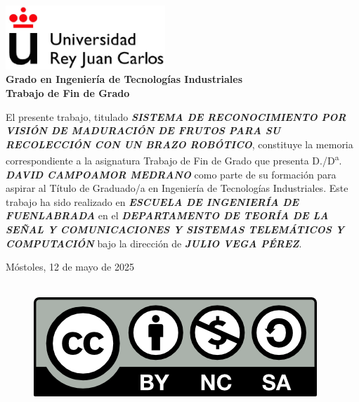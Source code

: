 

\thispagestyle{empty}
\begin{center}
    \includegraphics[width=0.45\textwidth]{figs/logo_urjc.jpg}\\[1cm]

    {\large{\textbf{Grado en Ingeniería de Tecnologías Industriales}}}\\[1cm]
    {\large{\textbf{Trabajo de Fin de Grado}}}\\[1cm]
\end{center}


El presente trabajo, titulado \textit{\textbf{SISTEMA DE RECONOCIMIENTO POR VISIÓN DE MADURACIÓN DE FRUTOS PARA SU RECOLECCIÓN CON UN BRAZO ROBÓTICO}}, constituye la memoria correspondiente a la asignatura Trabajo de Fin de Grado que presenta D./D\textsuperscript{a}. \textit{\textbf{DAVID CAMPOAMOR MEDRANO}} como parte de su formación para aspirar al Título de Graduado/a en Ingeniería de Tecnologías Industriales. Este trabajo ha sido realizado en \textit{\textbf{ESCUELA DE INGENIERÍA DE FUENLABRADA}} en el \textit{\textbf{DEPARTAMENTO DE TEORÍA DE LA SEÑAL Y COMUNICACIONES Y SISTEMAS TELEMÁTICOS Y COMPUTACIÓN}} bajo la dirección de \textit{\textbf{JULIO VEGA PÉREZ}}.\\[3cm]

\begin{flushright}
Móstoles, 12 de mayo de 2025
\end{flushright}

\cleardoublepage

\begin{figure}
 \ \ \ \ \includegraphics[width=0.25\linewidth]{figs/by-nc-sa.png}
 \label{fig:cc} 
 \end{figure}

